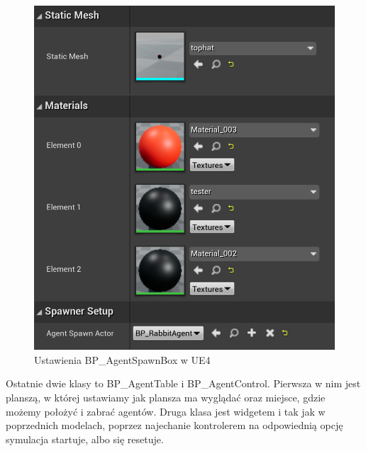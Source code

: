 \documentclass[a4paper,12pt,reqno]{article}
\begin{document}
\begin{figure}[H]%
\centering
\includegraphics[width=0.60\columnwidth]{graphics//agent/BP_AgentSpawnBox.png}
\caption{Ustawienia  BP\_AgentSpawnBox w UE4 
\label{BPExample}}%
%
\qquad
\end{figure} 

Ostatnie dwie klasy to BP\_AgentTable i BP\_AgentControl. Pierwsza w nim jest planszą, w której ustawiamy jak plansza ma wyglądać oraz miejsce, gdzie możemy położyć i zabrać agentów. Druga klasa jest widgetem i tak jak w poprzednich modelach, poprzez najechanie kontrolerem na odpowiednią opcję symulacja startuje, albo się resetuje.
\end{document}
